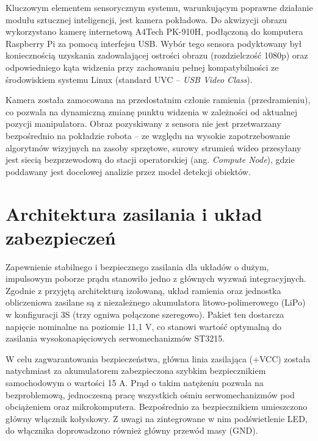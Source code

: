 \documentclass[11pt]{extreport}
\begin{document}
Kluczowym elementem sensorycznym systemu, warunkującym poprawne działanie modułu sztucznej inteligencji, jest kamera pokładowa. Do akwizycji obrazu wykorzystano kamerę internetową A4Tech PK-910H, podłączoną do komputera Raspberry Pi za pomocą interfejsu USB. Wybór tego sensora podyktowany był koniecznością uzyskania zadowalającej ostrości obrazu (rozdzielczość 1080p) oraz odpowiedniego kąta widzenia przy zachowaniu pełnej kompatybilności ze środowiskiem systemu Linux (standard UVC -- \textit{USB Video Class}). 

Kamera została zamocowana na przedostatnim członie ramienia (przedramieniu), co pozwala na dynamiczną zmianę punktu widzenia w zależności od aktualnej pozycji manipulatora. Obraz pozyskiwany z sensora nie jest przetwarzany bezpośrednio na pokładzie robota – ze względu na wysokie zapotrzebowanie algorytmów wizyjnych na zasoby sprzętowe, surowy strumień wideo przesyłany jest siecią bezprzewodową do stacji operatorskiej (ang. \textit{Compute Node}), gdzie poddawany jest docelowej analizie przez model detekcji obiektów.

\section{Architektura zasilania i układ zabezpieczeń}

Zapewnienie stabilnego i bezpiecznego zasilania dla układów o dużym, impulsowym poborze prądu stanowiło jedno z głównych wyzwań integracyjnych. Zgodnie z przyjętą architekturą izolowaną, układ ramienia oraz jednostka obliczeniowa zasilane są z niezależnego akumulatora litowo-polimerowego (LiPo) w konfiguracji 3S (trzy ogniwa połączone szeregowo). Pakiet ten dostarcza napięcie nominalne na poziomie 11,1 V, co stanowi wartość optymalną do zasilania wysokonapięciowych serwomechanizmów ST3215.

W celu zagwarantowania bezpieczeństwa, główna linia zasilająca (+VCC) została natychmiast za akumulatorem zabezpieczona szybkim bezpiecznikiem samochodowym o wartości 15 A. Prąd o takim natężeniu pozwala na bezproblemową, jednoczesną pracę wszystkich ośmiu serwomechanizmów pod obciążeniem oraz mikrokomputera. Bezpośrednio za bezpiecznikiem umieszczono główny włącznik kołyskowy. Z uwagi na zintegrowane w nim podświetlenie LED, do włącznika doprowadzono również główny przewód masy (GND).
\end{document}
